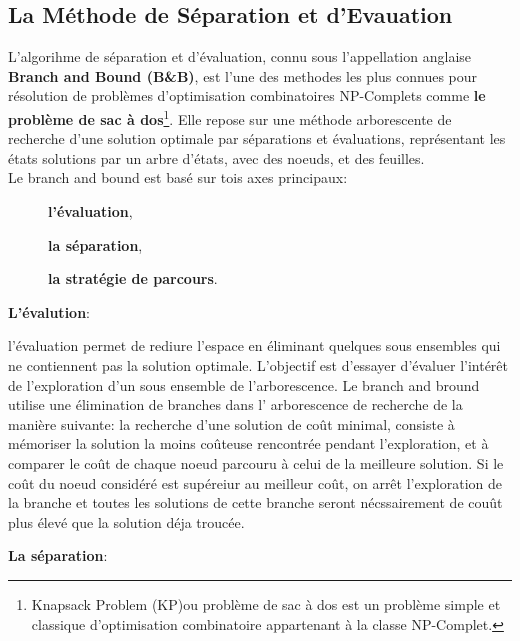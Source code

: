 \documentclass[a4paper,11pt,oneside]{report}
\theoremstyle{plain}
\newcommand{\0}{/ \! \! \! 0}
\theoremstyle{plain}
\begin{document}
\subsection{La M\'ethode de S\'eparation et d'Evauation}
 L'algorihme de s\'eparation et d'\'evaluation, connu sous l'appellation anglaise {\bf Branch and Bound (B\&B)}, est l'une des methodes les plus
 connues pour r\'esolution de probl\`emes d'optimisation combinatoires NP-Complets comme {\bf le probl\`eme de sac \`a dos}\footnote{Knapsack Problem 
  (KP)ou probl\`eme de sac \`a dos est un probl\`eme simple et classique d'optimisation combinatoire appartenant \`a la classe NP-Complet.}.
 Elle repose sur une m\'ethode arborescente de recherche d'une solution optimale par s\'eparations et \'evaluations, repr\'esentant les \'etats 
 solutions par un arbre d'\'etats, avec des noeuds, et des feuilles.\\
  Le branch and bound est bas\'e sur tois axes principaux:
  \begin{description}
   \item[] {\bf l'\'evaluation},
   \item[] {\bf la s\'eparation},
   \item[] {\bf la strat\'egie de parcours}.
  \end{description}
  {\bf L'\'evalution}:
  \begin{description}
  \item l'\'evaluation permet de rediure l'espace en \'eliminant quelques sous ensembles qui ne contiennent pas la solution optimale. L'objectif est d'essayer
   d'\'evaluer l'int\'er\^et de l'exploration d'un sous ensemble de l'arborescence. Le branch and bround utilise une \'elimination de branches dans l'
   arborescence de recherche de la mani\`ere suivante: la recherche d'une solution de co\^ut minimal, consiste \`a m\'emoriser la solution la moins
   co\^uteuse rencontr\'ee pendant l'exploration, et \`a comparer le co\^ut de chaque noeud parcouru \`a celui de la meilleure solution. Si le co\^ut du
   noeud consid\'er\'e est sup\'ereiur au meilleur co\^ut, on arr\^et l'exploration de la branche et toutes les solutions de cette branche seront 
   n\'ecssairement de cou\^ut plus \'elev\'e que la solution d\'eja trouc\'ee. 
  \end{description}
  {\bf La s\'eparation}:
\end{document}
